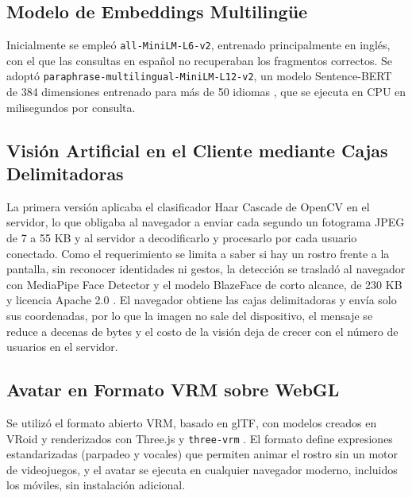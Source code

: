 \subsection{Modelo de Embeddings Multilingüe}
Inicialmente se empleó \texttt{all-\allowbreak{}MiniLM-\allowbreak{}L6-\allowbreak{}v2}, entrenado principalmente en inglés, con el que las consultas en español no recuperaban los fragmentos correctos. Se adoptó \texttt{paraphrase-\allowbreak{}multilingual-\allowbreak{}MiniLM-\allowbreak{}L12-\allowbreak{}v2}, un modelo Sentence-BERT de 384 dimensiones entrenado para más de 50 idiomas \cite{reimers2019sbert}, que se ejecuta en CPU en milisegundos por consulta.

\subsection{Visión Artificial en el Cliente mediante Cajas Delimitadoras}
La primera versión aplicaba el clasificador Haar Cascade de OpenCV \cite{viola2001rapid} en el servidor, lo que obligaba al navegador a enviar cada segundo un fotograma JPEG de 7 a 55 KB y al servidor a decodificarlo y procesarlo por cada usuario conectado. Como el requerimiento se limita a saber si hay un rostro frente a la pantalla, sin reconocer identidades ni gestos, la detección se trasladó al navegador con MediaPipe Face Detector y el modelo BlazeFace de corto alcance, de 230 KB y licencia Apache 2.0 \cite{bazarevsky2019blazeface,lugaresi2019mediapipe}. El navegador obtiene las cajas delimitadoras y envía solo sus coordenadas, por lo que la imagen no sale del dispositivo, el mensaje se reduce a decenas de bytes y el costo de la visión deja de crecer con el número de usuarios en el servidor.

\subsection{Avatar en Formato VRM sobre WebGL}
Se utilizó el formato abierto VRM, basado en glTF, con modelos creados en VRoid y renderizados con Three.js y \texttt{three-vrm} \cite{threevrm2024}. El formato define expresiones estandarizadas (parpadeo y vocales) que permiten animar el rostro sin un motor de videojuegos, y el avatar se ejecuta en cualquier navegador moderno, incluidos los móviles, sin instalación adicional.
